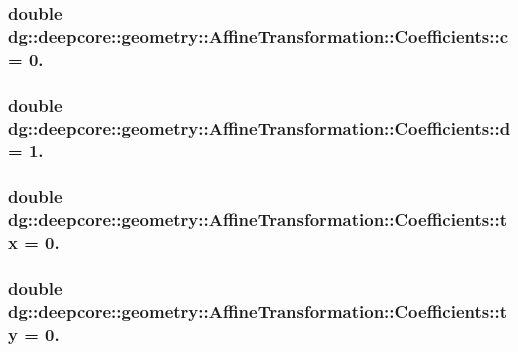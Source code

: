 \subsubsection[{\texorpdfstring{c}{c}}]{\setlength{\rightskip}{0pt plus 5cm}double dg\+::deepcore\+::geometry\+::\+Affine\+Transformation\+::\+Coefficients\+::c = 0.}\hypertarget{structdg_1_1deepcore_1_1geometry_1_1_affine_transformation_1_1_coefficients_a1e466cd17851d7d1543440e3ed118776}{}\label{structdg_1_1deepcore_1_1geometry_1_1_affine_transformation_1_1_coefficients_a1e466cd17851d7d1543440e3ed118776}
\subsubsection[{\texorpdfstring{d}{d}}]{\setlength{\rightskip}{0pt plus 5cm}double dg\+::deepcore\+::geometry\+::\+Affine\+Transformation\+::\+Coefficients\+::d = 1.}\hypertarget{structdg_1_1deepcore_1_1geometry_1_1_affine_transformation_1_1_coefficients_a04e053dd46073bfab0811374f5f31fb0}{}\label{structdg_1_1deepcore_1_1geometry_1_1_affine_transformation_1_1_coefficients_a04e053dd46073bfab0811374f5f31fb0}
\subsubsection[{\texorpdfstring{tx}{tx}}]{\setlength{\rightskip}{0pt plus 5cm}double dg\+::deepcore\+::geometry\+::\+Affine\+Transformation\+::\+Coefficients\+::tx = 0.}\hypertarget{structdg_1_1deepcore_1_1geometry_1_1_affine_transformation_1_1_coefficients_aeb1fd6e7b3fc0362b8634c7d8ec71fb9}{}\label{structdg_1_1deepcore_1_1geometry_1_1_affine_transformation_1_1_coefficients_aeb1fd6e7b3fc0362b8634c7d8ec71fb9}
\subsubsection[{\texorpdfstring{ty}{ty}}]{\setlength{\rightskip}{0pt plus 5cm}double dg\+::deepcore\+::geometry\+::\+Affine\+Transformation\+::\+Coefficients\+::ty = 0.}\hypertarget{structdg_1_1deepcore_1_1geometry_1_1_affine_transformation_1_1_coefficients_a9db9f5df99d6bcb63930e024320215ff}{}\label{structdg_1_1deepcore_1_1geometry_1_1_affine_transformation_1_1_coefficients_a9db9f5df99d6bcb63930e024320215ff}
